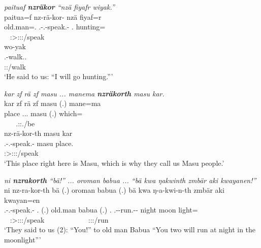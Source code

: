 \begin{exe}
	\ex \emph{paituaf \textbf{nzräkor} ``nzä fiyafr wiyak.''}\\
	\glll paitua=f nz-rä-kor-\Zero{} nzä fiyaf=r\\
	old.man=\Erg.\Sg{} \Fnsg.\Bet-\Irr.\Ndu-speak.\Rs-\Stsg{} \Fsg.\Abs{} hunting=\Purp{}\\
	~ {\Stsg:\Sbj>\Fpl:\Obj:\Irr:\Pfv/speak} ~ ~\\
	\sn
	\glll wo-yak\\
	\Fsg.\Alph-walk.\Ext.\Ndu\\
	\footnotesize{\Fsg:\Nonpast:\Ipfv/walk}\\
	\trans `He said to us: ``I will go hunting.''' 
	\label{ex249}
\end{exe}
\begin{exe}
	\ex \emph{kar zf rä zf masu ... manema \textbf{nzräkorth} masu kar.}\\
	\glll kar zf rä zf masu (.) mane=ma\\
	place \Imm{} \Tsg.\F.\Cop.\Ndu{} \Imm{} masu (.) which=\Char{}\\
	~ ~ {\Tsg.\F:\Sbj:\Nonpast.\Ipfv/be} ~ ~ ~ ~\\
	\sn
	\glll
	nz-rä-kor-th masu kar\\
	\Fnsg.\Bet-\Irr.\Ndu-speak.\Rs-\Stnsg{} masu place.\\
	\footnotesize{\Stpl:\Sbj>\Fpl:\Obj:\Irr:\Pfv/speak} ~ ~\\
	\trans `This place right here is Masu, which is why they call us Masu people.'\\ 
	\label{ex250}
\end{exe}
\begin{exe}
	\ex \emph{ni \textbf{nzrakorth} ``bä!'' ... oroman babua ... ``bä kwa ŋakwinth zmbär aki kwayanen!''}\\
	\glll ni nz-ra-kor-th bä (.) oroman babua (.) bä kwa{\fixgll} ŋ-a-kwi-n-th zmbär aki kwayan=en\\
	\Fnsg{} \Fnsg.\Bet-\Irr.\Du-speak.\Rs-\Stnsg{} \Second.\Abs{} (.) old.man babua (.) \Second.\Abs{} \Fut{} \M.\Alph-\Vc-run.\Ext-\Du-\Stnsg{} night moon light=\Loc\\
	~ {\Stpl:\Sbj>\Fdu:\Obj:\Irr:\Pfv/speak} ~ ~ ~ ~ ~ ~ ~ {\Stdu:\Sbj:\Nonpast:\Ipfv/run} ~ ~ ~\\
	\trans `They said to us (2): ``You!'' to old man Babua ``You two will run at night in the moonlight''' 
	\label{ex247}
\end{exe}

